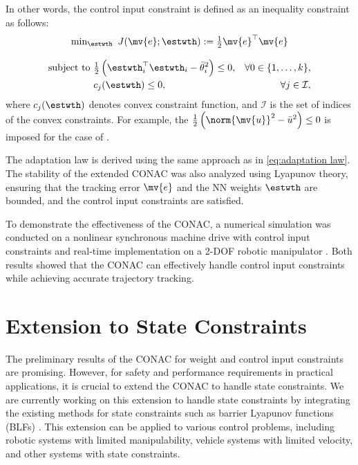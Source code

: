 \documentclass[conference]{IEEEtran}
\begin{document}
In other words, the control input constraint is defined as an inequality constraint as follows:
\begin{equation}
    \begin{matrix}
        \min_{\estwth} \ J(\mv{e};\estwth):= 
        \tfrac{1}{2} \mv{e}^\top \mv{e}
        \\ \\
        \begin{aligned}
        \text{subject to }&
        \tfrac{1}{2}
            \left(
                \estwth_i^\top \estwth_i - {\bar\theta}_i^2
            \right)
        \le0, &\forall 0\in\{1,\ldots,k\}, \\
        &
        c_j(\estwth) \le 0, &\forall j\in\mathcal{I}
        ,
        \end{aligned}
    \end{matrix}
    \label{eq:opt:problem2}
\end{equation}
where $c_j(\estwth)$ denotes convex constraint function, and $\mathcal{I}$ is the set of indices of the convex constraints.
For example, the 
$
    \tfrac{1}{2}
    \left(
        \norm{\mv{u}}^2 - {\bar u}^2
    \right)
    \le0
$
is imposed for the case of \cite{Ryu:2024ab}.

The adaptation law is derived using the same approach as in \eqref{eq:adaptation law}.
The stability of the extended CONAC was also analyzed using Lyapunov theory, ensuring that the tracking error $\mv{e}$ and the NN weights $\estwth$ are bounded, and the control input constraints are satisfied.

To demonstrate the effectiveness of the CONAC, a numerical simulation was conducted on a nonlinear synchronous machine drive with control input constraints \cite{Ryu:2024ab} and real-time implementation on a 2-DOF robotic manipulator \cite{Ryu:2025aa}.
Both results showed that the CONAC can effectively handle control input constraints while achieving accurate trajectory tracking.

\section{Extension to State Constraints}

The preliminary results of the CONAC for weight and control input constraints are promising.
However, for safety and performance requirements in practical applications, it is crucial to extend the CONAC to handle state constraints.
We are currently working on this extension to handle state constraints by integrating the existing methods for state constraints such as barrier Lyapunov functions (BLFs) \cite{Ames:2019aa}.
This extension can be applied to various control problems, including robotic systems with limited manipulability, vehicle systems with limited velocity, and other systems with state constraints.
\end{document}
